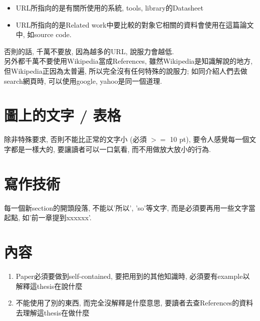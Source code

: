 \begin{enumerate}
{\begin{itemize}
{\begin{itemize}
          \item
          {
            URL所指向的是有關所使用的系統, tools, library的Datasheet
          } %

          \item
          {
            URL所指向的是Related work中要比較的對象它相關的資料會使用在這篇論文中, 如source code.
          } %
        \end{itemize}

        否則的話, 千萬不要放, 因為越多的URL, 說服力會越低.\\
 
        另外都千萬不要使用Wikipedia當成References, 雖然Wikipedia是知識解說的地方, 但Wikipedia正因為太普遍, 所以完全沒有任何特殊的說服力; 如同介紹人們去做search網頁時, 可以使用google, yahoo是同一個道理.
      } %
    \end{itemize}
  } %
\end{enumerate}

\section{圖上的文字 / 表格}

除非特殊要求, 否則不能比正常的文字小 (必須 $ >= $ 10 pt), 要令人感覺每一個文字都是一樣大的, 要讓讀者可以一口氣看, 而不用做放大放小的行為.

\section{寫作技術}

每一個新section的開頭段落, 不能以'所以', 'so'等文字, 而是必須要再用一些文字當起點, 如'前一章提到xxxxxx'.

\section{內容}

\begin{enumerate}
  \item
  {
    Paper必須要做到self-contained, 要把用到的其他知識時, 必須要有example以解釋這thesis在說什麼
  } %

  \item
  {
    不能使用了別的東西, 而完全沒解釋是什麼意思, 要讀者去查References的資料去理解這thesis在做什麼
  } %
\end{enumerate}

